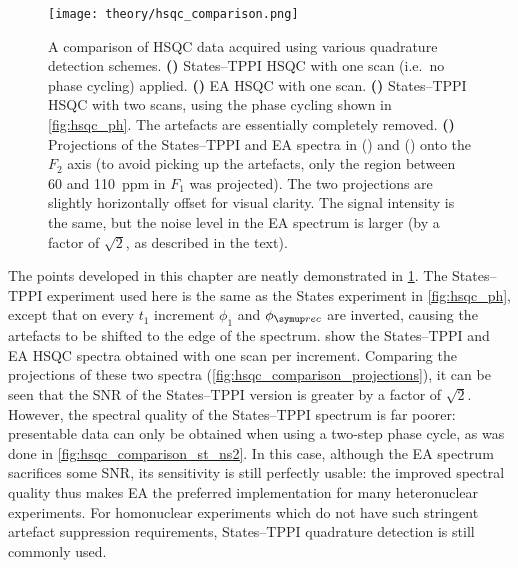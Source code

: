 \begin{figure}[htbp]
    \centering
    \texttt{[image: theory/hsqc\_comparison.png]}%
    {\label{fig:hsqc_comparison_st_ns1}}%
    {\label{fig:hsqc_comparison_ea_ns1}}%
    {\label{fig:hsqc_comparison_st_ns2}}%
    {\label{fig:hsqc_comparison_projections}}%
    \caption[Experimental comparison of States--TPPI and echo--antiecho HSQC]{
        A comparison of HSQC data acquired using various quadrature detection schemes.
        \textbf{()} States--TPPI HSQC with one scan (i.e.\ no phase cycling) applied.
        \textbf{()} EA HSQC with one scan.
        \textbf{()} States--TPPI HSQC with two scans, using the phase cycling shown in \cref{fig:hsqc_ph}. The artefacts are essentially completely removed.
        \textbf{()} Projections of the States--TPPI and EA spectra in () and () onto the $F_2$ axis (to avoid picking up the artefacts, only the region between 60 and \qty{110}{ppm} in $F_1$ was projected).
        The two projections are slightly horizontally offset for visual clarity.
        The signal intensity is the same, but the noise level in the EA spectrum is larger (by a factor of $\sqrt{2}$, as described in the text).
    }
    \label{fig:hsqc_comparison}
\end{figure}

The points developed in this chapter are neatly demonstrated in \cref{fig:hsqc_comparison}.
The States--TPPI experiment used here is the same as the States experiment in \cref{fig:hsqc_ph}, except that on every $t_1$ increment $\phi_1$ and $\phirec$ are inverted, causing the artefacts to be shifted to the edge of the spectrum.
 show the States--TPPI and EA HSQC spectra obtained with one scan per increment.
Comparing the projections of these two spectra (\cref{fig:hsqc_comparison_projections}), it can be seen that the SNR of the States--TPPI version is greater by a factor of $\sqrt{2}$.
However, the spectral quality of the States--TPPI spectrum is far poorer: presentable data can only be obtained when using a two-step phase cycle, as was done in \cref{fig:hsqc_comparison_st_ns2}.
In this case, although the EA spectrum sacrifices some SNR, its sensitivity is still perfectly usable: the improved spectral quality thus makes EA the preferred implementation for many heteronuclear experiments.
For homonuclear experiments which do not have such stringent artefact suppression requirements, States--TPPI quadrature detection is still commonly used.


